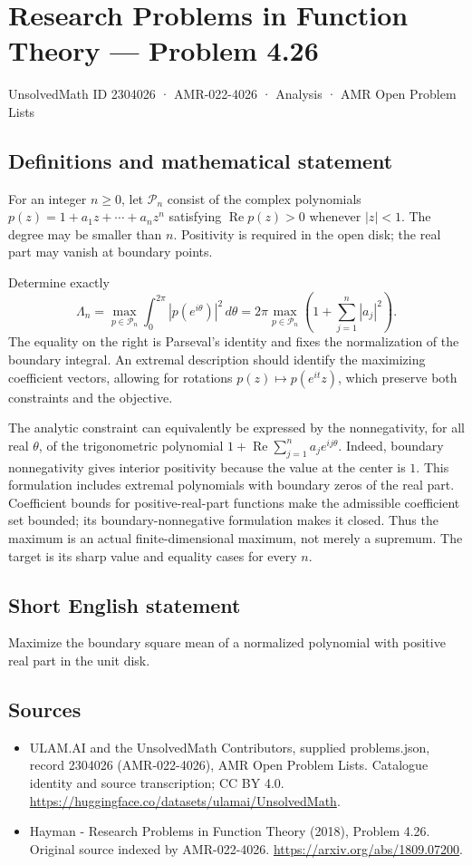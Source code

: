 \documentclass[11pt,a4paper]{article}
\begin{document}
\section*{Research Problems in Function Theory — Problem 4.26}\label{2304026}
{\small UnsolvedMath ID 2304026 · AMR-022-4026 · Analysis · AMR Open Problem Lists}
\subsection{Definitions and mathematical statement}
For an integer $n\geq0$, let $\mathcal P_n$ consist of the complex
polynomials
$p(z)=1+a_1z+\cdots+a_nz^n$ satisfying
$\operatorname{Re}p(z)>0$ whenever $|z|<1$. The degree may be
smaller than $n$. Positivity is required in the open disk; the
real part may vanish at boundary points.

Determine exactly
\[
 \Lambda_n=\max_{p\in\mathcal P_n}
       \int_0^{2\pi}|p(e^{i\theta})|^2\,d\theta
       =2\pi\max_{p\in\mathcal P_n}
                   \left(1+\sum_{j=1}^{n}|a_j|^2\right).
\]
The equality on the right is Parseval's identity and fixes the
normalization of the boundary integral. An extremal description
should identify the maximizing coefficient vectors, allowing for
rotations $p(z)\mapsto p(e^{it}z)$, which preserve both constraints
and the objective.

The analytic constraint can equivalently be expressed by the
nonnegativity, for all real $\theta$, of the trigonometric
polynomial
$1+\operatorname{Re}\sum_{j=1}^{n}a_je^{ij\theta}$.
Indeed, boundary nonnegativity gives interior positivity because
the value at the center is $1$. This formulation includes extremal
polynomials with boundary zeros of the real part. Coefficient
bounds for positive-real-part functions make the admissible
coefficient set bounded; its boundary-nonnegative formulation
makes it closed. Thus the maximum is an actual finite-dimensional
maximum, not merely a supremum. The target is its sharp value
and equality cases for every $n$.
\subsection{Short English statement}
Maximize the boundary square mean of a normalized polynomial with positive real part in the unit disk.
\subsection{Sources}
\begin{itemize}
\item[S1] ULAM.AI and the UnsolvedMath Contributors, supplied problems.json, record 2304026 (AMR-022-4026), AMR Open Problem Lists. Catalogue identity and source transcription; CC BY 4.0.
\url{https://huggingface.co/datasets/ulamai/UnsolvedMath}.
\item[S2] Hayman - Research Problems in Function Theory (2018), Problem 4.26. Original source indexed by AMR-022-4026.
\url{https://arxiv.org/abs/1809.07200}.
\end{itemize}
\end{document}
